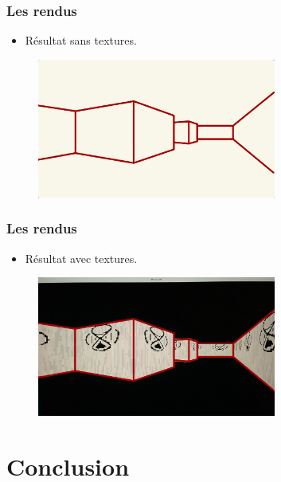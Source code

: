 \documentclass{beamer}
\begin{document}
\begin{frame}
    \frametitle{Les rendus}
    \begin{block}{}
        \begin{itemize}
            \item Résultat sans textures.
        \end{itemize}
    \end{block}
    \begin{figure}
        \centering
        \includegraphics[width=0.7\textwidth]{images/rendu-sans-texture.jpeg}
    \end{figure}
\end{frame}

\begin{frame}
    \frametitle{Les rendus}
    \begin{block}{}
        \begin{itemize}
            \item Résultat avec textures.
        \end{itemize}
    \end{block}
    \begin{figure}
        \centering
        \includegraphics[width=0.7\textwidth]{images/rendu-avec-texture.jpeg}
    \end{figure}
\end{frame}

\section{Conclusion}
\end{document}

